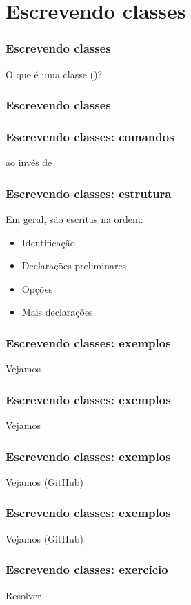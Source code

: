 \section{Escrevendo classes}

\begin{frame}
  \frametitle{Escrevendo classes}
  \LARGE
  O que é uma classe ()?
\end{frame}

\begin{frame}
  \frametitle{Escrevendo classes}
  \LARGE
\end{frame}

\begin{frame}
  \frametitle{Escrevendo classes: comandos}
  \LARGE
  \latexcode{\RequirePackage} ao invés de \latexcode{\usepackage}
\end{frame}

\begin{frame}
  \frametitle{Escrevendo classes: estrutura}
  \LARGE
  Em geral, são escritas na ordem:
  \vspace{1em}

  \begin{itemize}
    \item Identificação
    \item Declarações preliminares
    \item Opções
    \item Mais declarações
  \end{itemize}
\end{frame}

\begin{frame}
  \frametitle{Escrevendo classes: exemplos}
  \LARGE
  Vejamos 
\end{frame}

\begin{frame}
  \frametitle{Escrevendo classes: exemplos}
  \LARGE
  Vejamos 
\end{frame}

\begin{frame}
  \frametitle{Escrevendo classes: exemplos}
  \LARGE
  Vejamos \href{https://github.com/RocketshipGames/gapd.els/}{}
  (GitHub)
\end{frame}

\begin{frame}
  \frametitle{Escrevendo classes: exemplos}
  \LARGE
  Vejamos
  \href{https://github.com/noaham/research_note_cls/}{}
  (GitHub)
\end{frame}

\begin{frame}
  \frametitle{Escrevendo classes: exercício}
  \LARGE
  Resolver 
\end{frame}
